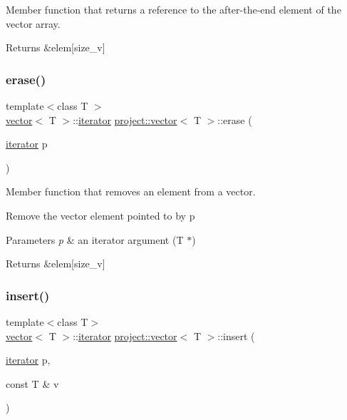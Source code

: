 Member function that returns a reference to the after-\/the-\/end element of the vector array. 

\begin{DoxyReturn}{Returns}
\&elem\mbox{[}size\+\_\+v\mbox{]} 
\end{DoxyReturn}
\mbox{\label{classproject_1_1vector_a5eb1005385fe0b2b9df65b32d9152619}} 
\subsubsection{\texorpdfstring{erase()}{erase()}}
{\footnotesize\ttfamily template$<$class T $>$ \\
\mbox{\hyperlink{classproject_1_1vector}{vector}}$<$ T $>$\+::\mbox{\hyperlink{classproject_1_1vector_a429c6a5f47b0de55ac858b3be5aeda8b}{iterator}} \mbox{\hyperlink{classproject_1_1vector}{project\+::vector}}$<$ T $>$\+::erase (\begin{DoxyParamCaption}\item[{\mbox{\hyperlink{classproject_1_1vector_a429c6a5f47b0de55ac858b3be5aeda8b}{iterator}}}]{p }\end{DoxyParamCaption})\hspace{0.3cm}{\ttfamily [inline]}}



Member function that removes an element from a vector. 

Remove the vector element pointed to by p 
\begin{DoxyParams}{Parameters}
{\em p} & an iterator argument (T $\ast$) \\
\hline
\end{DoxyParams}
\begin{DoxyReturn}{Returns}
\&elem\mbox{[}size\+\_\+v\mbox{]} 
\end{DoxyReturn}
\mbox{\label{classproject_1_1vector_a679394aec4be2d7ceea3261e47302545}} 
\subsubsection{\texorpdfstring{insert()}{insert()}}
{\footnotesize\ttfamily template$<$class T$>$ \\
\mbox{\hyperlink{classproject_1_1vector}{vector}}$<$ T $>$\+::\mbox{\hyperlink{classproject_1_1vector_a429c6a5f47b0de55ac858b3be5aeda8b}{iterator}} \mbox{\hyperlink{classproject_1_1vector}{project\+::vector}}$<$ T $>$\+::insert (\begin{DoxyParamCaption}\item[{\mbox{\hyperlink{classproject_1_1vector_a429c6a5f47b0de55ac858b3be5aeda8b}{iterator}}}]{p,  }\item[{const T \&}]{v }\end{DoxyParamCaption})\hspace{0.3cm}{\ttfamily [inline]}}



